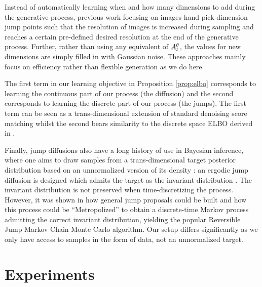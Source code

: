 Instead of automatically learning when and how many dimensions to add during the generative process, previous work focusing on images \cite{jing2022subspace, zhang2022dimensionality} hand pick dimension jump points such that the resolution of images is increased during sampling and reaches a certain pre-defined desired resolution at the end of the generative process. Further, rather than using any equivalent of $A_t^\theta$, the values for new dimensions are simply filled in with Gaussian noise. These approaches mainly focus on efficiency rather than flexible generation as we do here.


The first term in our learning objective in Proposition \ref{prop:elbo} corresponds to learning the continuous part of our process (the diffusion) and the second corresponds to learning the discrete part of our process (the jumps). The first term can be seen as a trans-dimensional extension of standard denoising score matching \cite{vincent2011connection} whilst the second bears similarity to the discrete space ELBO derived in \cite{campbell2022continuous}.

Finally, jump diffusions also have a long history of use in Bayesian inference, where one aims to draw samples from a trans-dimensional target posterior distribution based on an unnormalized version of its density \cite{grenander1994representations}: an ergodic jump diffusion is designed which admits the target as the invariant distribution \cite{grenander1994representations,phillips1995bayesian,miller1997automatic}. The invariant distribution is not preserved when time-discretizing the process.
However, it was shown in  \cite{green1995reversible,green2003trans} how general jump proposals could be built and how this process could be ``Metropolized'' to obtain a discrete-time Markov process admitting the correct invariant distribution, yielding the popular Reversible Jump Markov Chain Monte Carlo algorithm.
Our setup differs significantly as we only have access to samples in the form of data, not an unnormalized target.


\section{Experiments} \label{sec:tddm-experiments}

